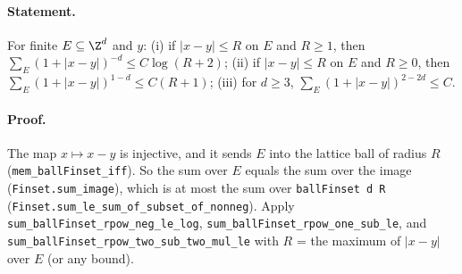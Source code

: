 \paragraph{Statement.} For finite $E\subseteq\Z^d$ and $y$: (i) if $|x-y|\le R$ on $E$ and $R\ge1$,
then $\sum_E(1+|x-y|)^{-d}\le C\log(R+2)$; (ii) if $|x-y|\le R$ on $E$ and $R\ge0$, then
$\sum_E(1+|x-y|)^{1-d}\le C(R+1)$; (iii) for $d\ge3$, $\sum_E(1+|x-y|)^{2-2d}\le C$.
\paragraph{Proof.} The map $x\mapsto x-y$ is injective, and it sends $E$ into the lattice ball of
radius $R$ (\texttt{mem\_ballFinset\_iff}). So the sum over $E$ equals the sum over the image
(\texttt{Finset.sum\_image}), which is at most the sum over \texttt{ballFinset d R}
(\texttt{Finset.sum\_le\_sum\_of\_subset\_of\_nonneg}). Apply
\texttt{sum\_ballFinset\_rpow\_neg\_le\_log}, \texttt{sum\_ballFinset\_rpow\_one\_sub\_le}, and
\texttt{sum\_ballFinset\_rpow\_two\_sub\_two\_mul\_le} with $R$ = the maximum of $|x-y|$ over $E$
(or any bound).
